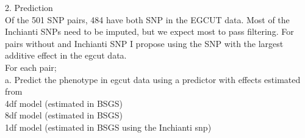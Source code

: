 \documentclass[paper=a4, fontsize=11pt]{scrartcl}					%
\numberwithin{equation}{section}									%
\numberwithin{figure}{section}										%
\numberwithin{table}{section}										%
\begin{document}
\vspace{1cm}

2. Prediction \\

Of the 501 SNP pairs, 484 have both SNP in the EGCUT data. Most of the Inchianti SNPs need to be imputed, but we expect most to pass filtering. For pairs without and Inchianti SNP I propose using the SNP with the largest additive effect in the egcut data. \\

For each pair; \\

a. Predict the phenotype in egcut data using a predictor with effects estimated from \\

4df model (estimated in BSGS) \\
8df model (estimated in BSGS) \\
1df model (estimated in BSGS using the Inchianti snp) \\

















\end{document}
